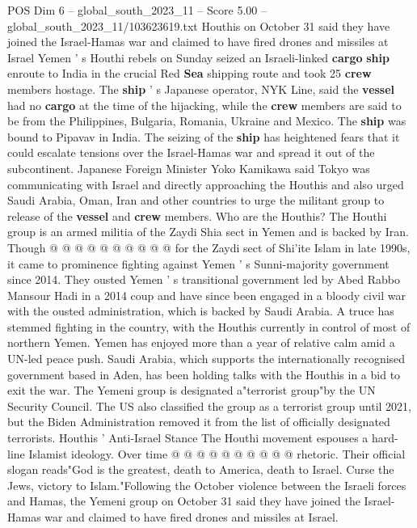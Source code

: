 \begin{textsample}{POS Dim 6 – global\_south\_2023\_11 – Score 5.00 – global\_south\_2023\_11/103623619.txt}  \label{ex:f6_pos_307}
Houthis on October 31 said they have joined the Israel-Hamas war and claimed to have fired drones and missiles at Israel Yemen ' s Houthi rebels on Sunday seized an Israeli-linked \textbf{cargo} \textbf{ship} enroute to India in the crucial Red \textbf{Sea} shipping route and took 25 \textbf{crew} members hostage.
The \textbf{ship} ' s Japanese operator, NYK Line, said the \textbf{vessel} had no \textbf{cargo} at the time of the hijacking, while the \textbf{crew} members are said to be from the Philippines, Bulgaria, Romania, Ukraine and Mexico.
The \textbf{ship} was bound to Pipavav in India.
The seizing of the \textbf{ship} has heightened fears that it could escalate tensions over the Israel-Hamas war and spread it out of the subcontinent.
Japanese Foreign Minister Yoko Kamikawa said Tokyo was communicating with Israel and directly approaching the Houthis and also urged Saudi Arabia, Oman, Iran and other countries to urge the militant group to release of the \textbf{vessel} and \textbf{crew} members.
Who are the Houthis?
The Houthi group is an armed militia of the Zaydi Shia sect in Yemen and is backed by Iran.
Though @ @ @ @ @ @ @ @ @ @ for the Zaydi sect of Shi'ite Islam in late 1990s, it came to prominence fighting against Yemen ' s Sunni-majority government since 2014.
They ousted Yemen ' s transitional government led by Abed Rabbo Mansour Hadi in a 2014 coup and have since been engaged in a bloody civil war with the ousted administration, which is backed by Saudi Arabia.
A truce has stemmed fighting in the country, with the Houthis currently in control of most of northern Yemen.
Yemen has enjoyed more than a year of relative calm amid a UN-led peace push.
Saudi Arabia, which supports the internationally recognised government based in Aden, has been holding talks with the Houthis in a bid to exit the war.
The Yemeni group is designated a"terrorist group"by the UN Security Council.
The US also classified the group as a terrorist group until 2021, but the Biden Administration removed it from the list of officially designated terrorists.
Houthis ' Anti-Israel Stance The Houthi movement espouses a hard-line Islamist ideology.
Over time @ @ @ @ @ @ @ @ @ @ rhetoric.
Their official slogan reads"God is the greatest, death to America, death to Israel.
Curse the Jews, victory to Islam."Following the October violence between the Israeli forces and Hamas, the Yemeni group on October 31 said they have joined the Israel-Hamas war and claimed to have fired drones and missiles at Israel.

\end{textsample}
